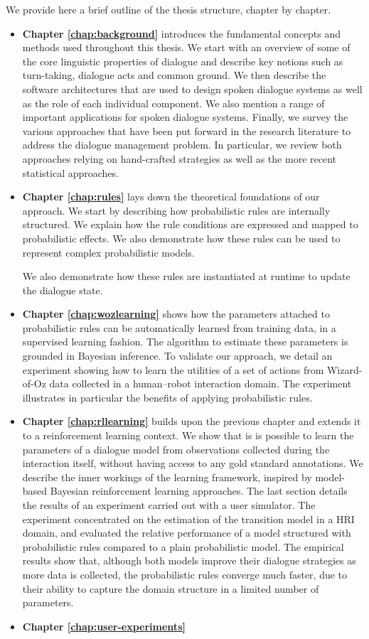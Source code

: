 We provide here a brief outline of the thesis structure, chapter by chapter. 
\begin{itemize}
\item \textbf{Chapter \ref{chap:background}} introduces the fundamental concepts and methods used throughout this thesis. We start with an overview of some of the core linguistic properties of dialogue and describe key notions such as turn-taking, dialogue acts and common ground.  We then describe the software architectures that are used to design spoken dialogue systems as well as the role of each individual component.  We also mention a range of important applications for spoken dialogue systems. Finally, we survey the various approaches that have been put forward in the research literature to address the dialogue management problem.  In particular, we review both approaches relying on hand-crafted strategies as well as the more recent statistical approaches.

\item \textbf{Chapter \ref{chap:rules}} lays down the theoretical foundations of our approach.  We start by describing how probabilistic rules are internally structured.  We explain how the rule conditions are expressed and mapped to probabilistic effects.  We also demonstrate how these rules can be used to represent complex probabilistic models. 

We also demonstrate how these rules are instantiated at runtime to update the dialogue state.  

\item \textbf{Chapter \ref{chap:wozlearning}} shows how the parameters attached to probabilistic rules can be automatically learned from training data, in a supervised learning fashion. The algorithm to estimate these parameters is grounded in Bayesian inference.  To validate our approach, we detail an experiment showing how to learn the utilities of a set of actions from Wizard-of-Oz data collected in a human--robot interaction domain.  The experiment illustrates in particular the benefits of applying probabilistic rules.

\item \textbf{Chapter \ref{chap:rllearning}} builds upon the previous chapter and extends it to a reinforcement learning context.  We show that is is possible to learn the parameters of a dialogue model from observations collected during the interaction itself, without having access to any gold standard annotations.  We describe the inner workings of the learning framework, inspired by model-based Bayesian reinforcement learning approaches. The last section details the results of an experiment carried out with a user simulator.  The experiment concentrated on the estimation of the transition model in a HRI domain, and evaluated the relative performance of a  model structured with probabilistic rules compared to a plain probabilistic model.  The empirical results show that, although both models improve their dialogue strategies as more data is collected, the probabilistic rules converge much faster, due to their ability to capture the domain structure in a limited number of parameters.

\item \textbf{Chapter \ref{chap:user-experiments}} 

\end{itemize}